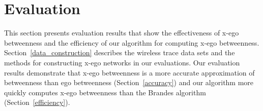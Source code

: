 \section{Evaluation}\label{evaluation}
This section presents evaluation results that show the effectiveness of x-ego betweenness and the efficiency of our algorithm for computing x-ego betweenness.
Section~\ref{data_construction} describes the wireless trace data sets and the methods for constructing x-ego networks in our evaluations.
Our evaluation results demonstrate that x-ego betweenness is a more accurate approximation of betweenness than ego betweenness (Section~\ref{accuracy}) and our algorithm more quickly computes x-ego betweenness than the Brandes algorithm (Section~\ref{efficiency}).





 
